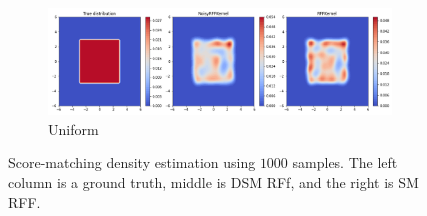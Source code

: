 \begin{figure}[H]
    \begin{subfigure}[b]{0.8\textwidth}
        \includegraphics[width=\textwidth]{figures/score_matching/2D/Uniform1000.png}
        \caption{Uniform}
    \end{subfigure}

    \caption{Score-matching density estimation using $1000$ samples.
    The left column is a ground truth, middle is DSM RFf,
    and the right is SM RFF.}
    \label{fig:2d_1000_app}
\end{figure}
